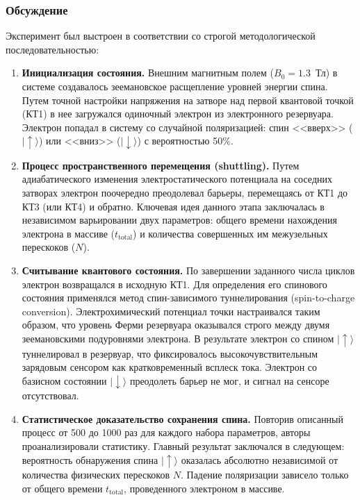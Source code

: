 \documentclass[a4paper,14pt]{extreport} %
\begin{document}
\subsubsection{Обсуждение}
Эксперимент был выстроен в соответствии со строгой
методологической последовательностью:
\begin{enumerate}
    \item \textbf{Инициализация состояния.} Внешним магнитным полем ($B_0 = 1.3$~Тл) в системе создавалось зеемановское расщепление уровней энергии спина. Путем точной настройки напряжения на затворе над первой квантовой точкой (КТ1) в нее загружался одиночный электрон из электронного резервуара. Электрон попадал в систему со случайной поляризацией: спин <<вверх>> ($|\!\uparrow\rangle$) или <<вниз>> ($|\!\downarrow\rangle$) с вероятностью 50\%.
    
    \item \textbf{Процесс пространственного перемещения (shuttling).} Путем адиабатического изменения электростатического потенциала на соседних затворах электрон поочередно преодолевал барьеры, перемещаясь от КТ1 до КТ3 (или КТ4) и обратно. Ключевая идея данного этапа заключалась в независимом варьировании двух параметров: общего времени нахождения электрона в массиве ($t_{\text{total}}$) и количества совершенных им межузельных перескоков ($N$).
    
    \item \textbf{Считывание квантового состояния.} По завершении заданного числа циклов электрон возвращался в исходную КТ1. Для определения его спинового состояния применялся метод спин-зависимого туннелирования (spin-to-charge conversion). Электрохимический потенциал точки настраивался таким образом, что уровень Ферми резервуара оказывался строго между двумя зеемановскими подуровнями электрона. В результате электрон со спином $|\!\uparrow\rangle$ туннелировал в резервуар, что фиксировалось высокочувствительным зарядовым сенсором как кратковременный всплеск тока. Электрон со базисном состоянии $|\!\downarrow\rangle$ преодолеть барьер не мог, и сигнал на сенсоре отсутствовал.
    
    \item \textbf{Статистическое доказательство сохранения спина.} Повторив описанный процесс от 500 до 1000 раз для каждого набора параметров, авторы проанализировали статистику. Главный результат заключался в следующем: вероятность обнаружения спина $|\!\uparrow\rangle$ оказалась абсолютно независимой от количества физических перескоков $N$. Падение поляризации зависело только от общего времени $t_{\text{total}}$, проведенного электроном в массиве. 
\end{enumerate}
\end{document}
